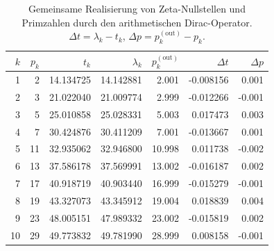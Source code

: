 \documentclass[11pt,a4paper]{article}
\begin{document}
\begin{table}[htbp]
\centering
\small
\begin{tabular}{r r r r r r r}
\toprule
$k$ & $p_k$ & $t_k$ & $\lambda_k$ & $p_k^{(\mathrm{out})}$ & $\Delta t$ & $\Delta p$\\
\midrule
1  & 2  & 14.134725 & 14.142881 & 2.001 & -0.008156 & 0.001 \\
2  & 3  & 21.022040 & 21.009774 & 2.999 & -0.012266 & -0.001 \\
3  & 5  & 25.010858 & 25.028331 & 5.003 &  0.017473 & 0.003 \\
4  & 7  & 30.424876 & 30.411209 & 7.001 & -0.013667 & 0.001 \\
5  & 11 & 32.935062 & 32.946800 & 10.998&  0.011738 & -0.002 \\
6  & 13 & 37.586178 & 37.569991 & 13.002& -0.016187 & 0.002 \\
7  & 17 & 40.918719 & 40.903440 & 16.999& -0.015279 & -0.001 \\
8  & 19 & 43.327073 & 43.345912 & 19.004&  0.018839 & 0.004 \\
9  & 23 & 48.005151 & 47.989332 & 23.002& -0.015819 & 0.002 \\
10 & 29 & 49.773832 & 49.781990 & 28.999&  0.008158 & -0.001 \\
\bottomrule
\end{tabular}
\caption{Gemeinsame Realisierung von Zeta-Nullstellen und Primzahlen
durch den arithmetischen Dirac-Operator.
$\Delta t=\lambda_k-t_k$, $\Delta p=p_k^{(\mathrm{out})}-p_k$.}
\label{tab:dirac-first-10}
\end{table}
\end{document}
